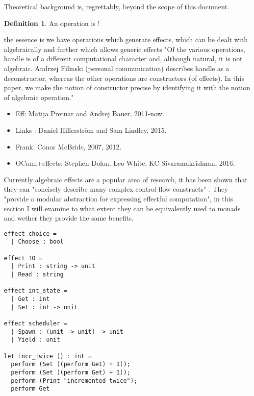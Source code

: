 \documentclass[a4paper,10pt]{article}
\theoremstyle{definition}
\newtheorem{definition}{Definition}[section]
\begin{document}
Theoretical background is, regrettably, beyond the scope of this document.
\begin{definition}
    An operation is !
\end{definition}

the essence is we have operations which generate effects,
which can be dealt with algebraically %
and further which allows generic effects
"Of the various operations, handle is of a different computational character and, although natural, it is not algebraic. Andrzej Filinski (personal communication) describes handle as a deconstructor, whereas the other operations are constructors (of effects). In this paper, we make the notion of constructor precise by identifying it with the notion of algebraic operation."

\begin{itemize}
    \item Eff: Matija Pretnar and Andrej Bauer, 2011-now.
    \item Links : Daniel Hillerström and Sam Lindley, 2015.
    \item Frank: Conor McBride, 2007, 2012.
    \item OCaml+effects: Stephen Dolan, Leo White, KC Sivaramakrishnan, 2016.
\end{itemize}

Currently algebraic effects are a popular area of research,
it has been shown that they can "concisely describe many complex control-flow constructs" \cite{leijen2017type}.
They "provide a modular abstraction for expressing effectful computation"\cite{dolan2015effective},
in this section I will examine to what extent they can be equivalently used to monads and wether
they provide the same benefits.

\begin{verbatim}
effect choice =
  | Choose : bool

effect IO =
  | Print : string -> unit
  | Read : string

effect int_state =
  | Get : int
  | Set : int -> unit

effect scheduler =
  | Spawn : (unit -> unit) -> unit
  | Yield : unit

let incr_twice () : int =
  perform (Set ((perform Get) + 1));
  perform (Set ((perform Get) + 1));
  perform (Print "incremented twice");
  perform Get
\end{verbatim}
\end{document}
